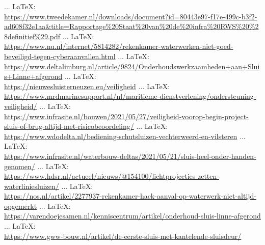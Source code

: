 \begin{thebibliography}{99}
{{{{%
%
%





 ... \LaTeX:\\ \url{https://www.tweedekamer.nl/downloads/document?id=80443e97-f17e-499c-b3f2-ad608f32e1aa&title=Rapportage%20Staat%20van%20de%20infra%20RWS%20%28definitief%29.pdf}
 ... \LaTeX:\\ \url{https://www.nu.nl/internet/5814282/rekenkamer-waterwerken-niet-goed-beveiligd-tegen-cyberaanvallen.html}
 ... \LaTeX:\\ \url{https://www.deltalimburg.nl/article/9824/Onderhoudswerkzaamheden+aan+Sluis+Linne+afgerond}
 ... \LaTeX:\\ \url{https://nieuwesluisterneuzen.eu/veiligheid}
 ... \LaTeX:\\ \url{https://www.mrdmarinesupport.nl/nl/maritieme-dienstverlening/ondersteuning-veiligheid/}
 ... \LaTeX:\\ \url{https://www.infrasite.nl/bouwen/2021/05/27/veiligheid-voorop-begin-project-sluis-of-brug-altijd-met-risicobeoordeling/}
 ... \LaTeX:\\ \url{https://www.wdodelta.nl/bediening-schutsluizen-vechterweerd-en-vilsteren}
 ... \LaTeX:\\ \url{https://www.infrasite.nl/waterbouw-deltas/2021/05/21/sluis-heel-onder-handen-genomen/}
 ... \LaTeX:\\ \url{https://www.hdsr.nl/actueel/nieuws/@154100/lichtprojecties-zetten-waterliniesluizen/}
 ... \LaTeX:\\ \url{https://nos.nl/artikel/2277937-rekenkamer-hack-aanval-op-waterwerk-niet-altijd-opgemerkt}
 ... \LaTeX:\\ \url{https://varendoejesamen.nl/kenniscentrum/artikel/onderhoud-sluis-linne-afgerond}
 ... \LaTeX:\\ \url{https://www.gww-bouw.nl/artikel/de-eerste-sluis-met-kantelende-sluisdeur/}
}}}}
\end{thebibliography}
